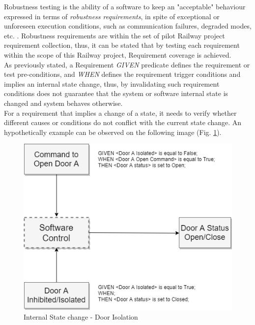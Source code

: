 Robustness testing is the ability of a software to keep an "acceptable" behaviour expressed in terms of \textit{robustness requirements}, in spite of exceptional or unforeseen execution conditions, such as communication failures, degraded modes, etc. \cite{khendek_model-based_2005}. Robustness requirements are within the set of pilot Railway project requirement collection, thus, it can be stated that by testing each requirement within the scope of this Railway project, Requirement coverage is achieved.\\

As previously stated, a Requirement \textit{GIVEN} predicate defines the requirement or test pre-conditions, and \textit{WHEN} defines the requirement trigger conditions and implies an internal state change, thus, by invalidating such requirement conditions does not guarantee that the system or software internal state is changed and system behaves otherwise.\\

For a requirement that implies a change of a state, it needs to verify whether different causes or conditions do not conflict with the current state change. An hypothetically example can be observed on the following image (Fig. \ref{fig:door_isolation}).\\

\begin{figure}[H]
    \centering
    \includegraphics[scale=0.6]{images/isolation_diagram.png}
    \caption{Internal State change - Door Isolation}
    \label{fig:door_isolation}
\end{figure}

